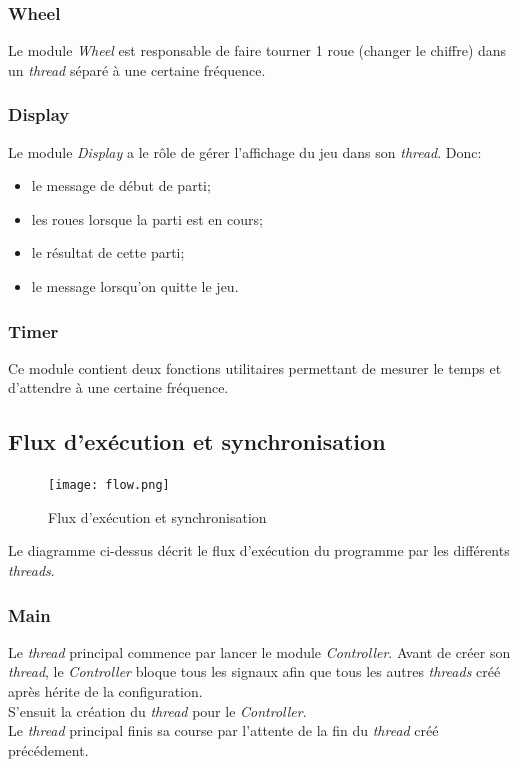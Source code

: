 \documentclass[11pt, a4paper]{article}
\begin{document}
\subsubsection{Wheel}
Le module \textit{Wheel} est responsable de faire tourner 1 roue (changer le chiffre) dans un \textit{thread} séparé à une certaine fréquence.

\subsubsection{Display}
Le module \textit{Display} a le rôle de gérer l'affichage du jeu dans son \textit{thread}. Donc:
\begin{itemize}
    \item le message de début de parti;
    \item les roues lorsque la parti est en cours;
    \item le résultat de cette parti;
    \item le message lorsqu'on quitte le jeu.
\end{itemize}

\subsubsection{Timer}
Ce module contient deux fonctions utilitaires permettant de mesurer le temps et
d'attendre à une certaine fréquence.

\newpage

\subsection{Flux d'exécution et synchronisation}
\label{Flux d'exécution et synchronisation}

\begin{figure}[H]
    \begin{center}
        \texttt{[image: flow.png]}
    \end{center}
    \caption{Flux d'exécution et synchronisation}
    \label{Flux d'exécution et synchronisation}
\end{figure}

\newpage

Le diagramme ci-dessus décrit le flux d'exécution du programme par les différents \textit{threads}.

\subsubsection{Main}
Le \textit{thread} principal commence par lancer le module \textit{Controller}.
Avant de créer son \textit{thread}, le \textit{Controller} bloque tous les signaux
afin que tous les autres \textit{threads} créé après hérite de la configuration. \\
S'ensuit la création du \textit{thread} pour le \textit{Controller}. \\
Le \textit{thread} principal finis sa course par l'attente de la fin du \textit{thread} créé précédement.
\end{document}
